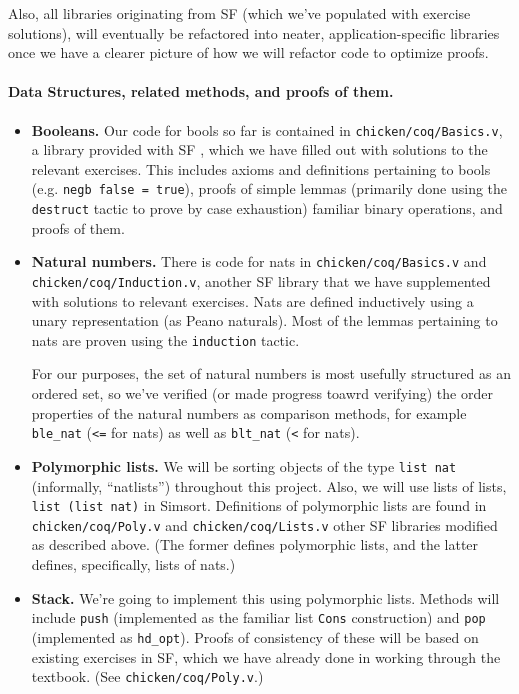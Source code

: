 \documentclass{article}
\begin{document}
Also, all libraries originating from SF \cite{sf} (which we've populated
with exercise solutions), will eventually be refactored into neater,
application-specific libraries once we have a clearer picture of how
we will refactor code to optimize proofs.

\paragraph{Data Structures, related methods, and proofs of them.}

\begin{itemize}
  \item \textbf{Booleans.}
Our code for bools so far is contained in \verb`chicken/coq/Basics.v`,
a library provided with SF \cite{sf}, which we have filled out with solutions
to the relevant exercises.
This includes axioms and definitions pertaining to bools
(e.g. \verb+negb false = true+), proofs of simple lemmas (primarily done
using the \verb+destruct+ tactic to prove by case exhaustion)
familiar binary operations, and proofs of them.

  \item \textbf{Natural numbers.}
    There is code for nats in \verb|chicken/coq/Basics.v| and
    \verb|chicken/coq/Induction.v|, another SF library that we have
    supplemented with solutions to relevant exercises.
    Nats are defined inductively using a unary representation
    (as Peano naturals).
    Most of the lemmas pertaining to nats are proven using
    the \verb+induction+ tactic.

    For our purposes, the set of natural numbers is most usefully
    structured as an ordered set, so we've verified (or made progress
    toawrd verifying) the order properties of the natural numbers
    as comparison methods, for example
    \verb`ble_nat` (\verb`<=` for nats) as well as \verb`blt_nat` (\verb`<` for nats).

  \item \textbf{Polymorphic lists.}
We will be sorting objects of the type \verb`list nat` (informally,
``natlists'') throughout this project.
Also, we will use lists of lists, \verb`list (list nat)` in Simsort.
Definitions of polymorphic lists are found in \verb`chicken/coq/Poly.v`
and \verb`chicken/coq/Lists.v`
other SF libraries modified as described above.
(The former defines polymorphic lists,
and the latter defines, specifically, lists of nats.)

  \item \textbf{Stack.}
    We're going to implement this using polymorphic lists.
    Methods will include \verb`push` (implemented as the familiar list
\verb`Cons` construction) and \verb`pop` (implemented as \verb`hd_opt`). Proofs
of consistency of these will be based on existing exercises in SF, which we
have already done in working through the textbook. (See
\verb`chicken/coq/Poly.v`.)


\end{itemize}
\end{document}
